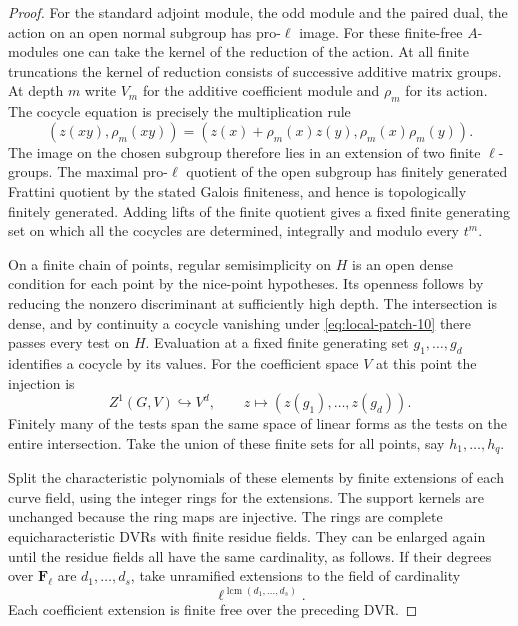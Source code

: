\begin{proof}
For the standard adjoint module, the odd module and the paired
dual, the action on an open normal subgroup has pro-\(\ell\)
image. For these finite-free \(A\)-modules one can take the
kernel of the reduction of the action. At all finite
truncations the kernel of reduction consists of successive
additive matrix groups. At depth \(m\) write \(V_m\) for the additive coefficient module and \(\rho_m\) for its action. The cocycle equation is precisely the multiplication rule 
\[
 (z(xy),\rho_m(xy))=(z(x)+\rho_m(x)z(y),\rho_m(x)\rho_m(y)).
\]
 The image on the chosen subgroup therefore lies in an extension of two finite \(\ell\)-groups. The maximal pro-\(\ell\) quotient of the
open subgroup has finitely generated Frattini quotient by the
stated Galois finiteness, and hence is topologically finitely
generated. Adding lifts of the finite quotient gives a fixed
finite generating set on which all the cocycles are
determined, integrally and modulo every \(t^m\).

On a finite chain of points, regular semisimplicity on \(H\) is
an open dense condition for each point by the nice-point
hypotheses. Its openness follows by reducing the nonzero
discriminant at sufficiently high depth. The intersection is
dense, and by continuity a cocycle vanishing under \eqref{eq:local-patch-10} there
passes every test on \(H\). Evaluation at a fixed finite generating set \(g_1,\ldots,g_d\) identifies a cocycle by its values. For the coefficient space \(V\) at this point the injection is
\[
 Z^1(G,V)\hookrightarrow V^d,\qquad z\longmapsto(z(g_1),\ldots,z(g_d)).
\] Finitely many of the tests span the same space of
linear forms as the tests on the entire intersection. Take
the union of these finite sets for all points, say
\(h_1,\ldots,h_q\).

Split the characteristic polynomials of these elements by
finite extensions of each curve field, using the integer
rings for the extensions. The support kernels are unchanged
because the ring maps are injective. The rings are complete
equicharacteristic DVRs with finite residue fields. They can
be enlarged again until the residue fields all have the same
cardinality, as follows. If their degrees over \(\mathbf F_\ell\) are \(d_1,\ldots,d_s\), take unramified extensions to the field of cardinality 
\[
 \ell^{\operatorname{lcm}(d_1,\ldots,d_s)}.
\]
 Each coefficient extension is finite
free over the preceding DVR.


\end{proof}
